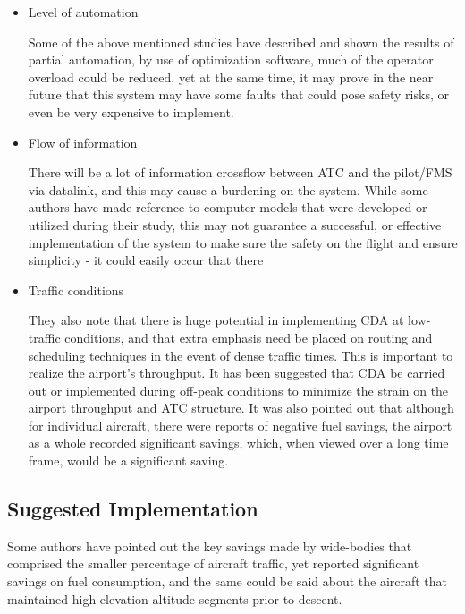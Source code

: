 \documentclass{aer1315-pretty}
\begin{document}
\begin{itemize}
\item Level of automation\par
Some of the above mentioned studies have described and shown the results of partial automation, by use of optimization software, much of the operator overload could be reduced, yet at the same time, it may prove in the near future that this system may have some faults that could pose safety risks, or even be very expensive to implement.

\item Flow of information\par
There will be a lot of information crossflow between ATC and the pilot/FMS via datalink, and this may cause a burdening on the system. While some authors have made reference to computer models that were developed or utilized during their study, this may not guarantee a successful, or effective implementation of the system to make sure the safety on the flight  and  ensure simplicity - it could easily occur that there

\item Traffic conditions\par
They also note that there is huge potential in implementing CDA at low-traffic conditions, and that extra emphasis need be placed on routing and scheduling techniques in the event of dense traffic times. This is important to realize the airport's throughput. It has been suggested that CDA  be carried out or implemented during off-peak conditions to minimize the strain on the airport throughput and ATC structure. It was also pointed out that although for individual aircraft, there were reports of negative fuel savings, the airport as a whole recorded significant savings, which, when viewed over a long time frame, would be a significant saving.
\end{itemize}

\subsection{Suggested Implementation} \label{ssec:implementation}  

Some authors have pointed out the key savings made by wide-bodies that comprised the smaller percentage of aircraft traffic, yet reported significant savings on fuel consumption, and the same could be said about the aircraft that maintained high-elevation altitude segments prior to descent.\par
\end{document}

